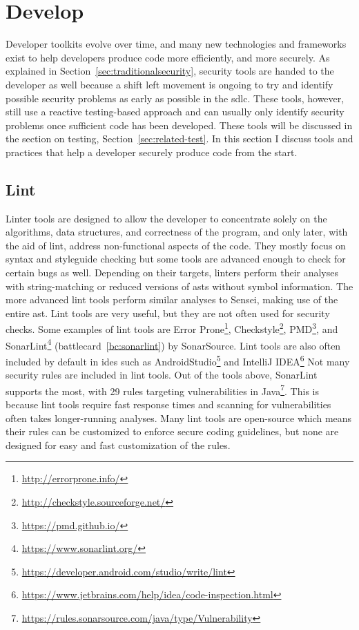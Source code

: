 \section{Develop}

Developer toolkits evolve over time, and many new technologies and frameworks exist to help developers produce code more efficiently, and more securely.
As explained in Section~\ref{sec:traditionalsecurity}, security tools are handed to the developer as well because a shift left movement is ongoing to try and identify possible security problems as early as possible in the \gls{sdlc}.
These tools, however, still use a reactive testing-based approach and can usually only identify security problems once sufficient code has been developed.
These tools will be discussed in the section on testing, Section~\ref{sec:related-test}.
In this section I discuss tools and practices that help a developer securely produce code from the start.

\subsection{Lint}
Linter tools are designed to allow the developer to concentrate solely on the algorithms, data structures, and correctness of the program, and only later, with the aid of lint, address non-functional aspects of the code.
They mostly focus on syntax and styleguide checking but some tools are advanced enough to check for certain bugs as well.
Depending on their targets, linters perform their analyses with string-matching or reduced versions of \glspl{ast} without symbol information.
The more advanced lint tools perform similar analyses to Sensei, making use of the entire \gls{ast}.
Lint tools are very useful, but they are not often used for security checks.
Some examples of lint tools are Error Prone\footnote{\url{http://errorprone.info/}}, Checkstyle\footnote{\url{http://checkstyle.sourceforge.net/}}, PMD\footnote{\url{https://pmd.github.io/}}, and SonarLint\footnote{\url{https://www.sonarlint.org/}} (battlecard~\ref{bc:sonarlint}) by SonarSource.
Lint tools are also often included by default in \glspl{ide} such as AndroidStudio\footnote{\url{https://developer.android.com/studio/write/lint}} and IntelliJ IDEA\footnote{\url{https://www.jetbrains.com/help/idea/code-inspection.html}}
Not many security rules are included in lint tools.
Out of the tools above, SonarLint supports the most, with 29 rules targeting vulnerabilities in Java\footnote{\url{https://rules.sonarsource.com/java/type/Vulnerability}}.
This is because lint tools require fast response times and scanning for vulnerabilities often takes longer-running analyses.
Many lint tools are open-source which means their rules can be customized to enforce secure coding guidelines, but none are designed for easy and fast customization of the rules.


